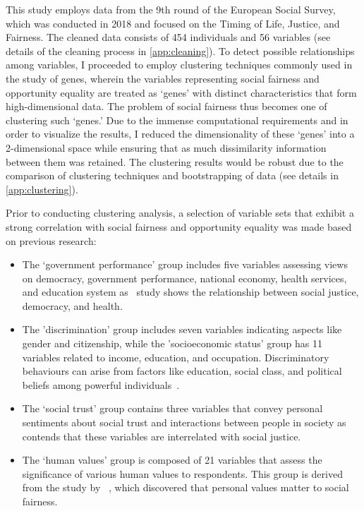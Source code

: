 This study employs data from the 9th round of the European Social Survey, which was conducted in 2018 and focused on the Timing of Life, Justice, and Fairness. The cleaned data consists of 454 individuals and 56 variables (see details of the cleaning process in \ref{app:cleaning}). To detect possible relationships among variables, I proceeded to employ clustering techniques commonly used in the study of genes, wherein the variables representing social fairness and opportunity equality are treated as ‘genes’ with distinct characteristics that form high-dimensional data. The problem of social fairness thus becomes one of clustering such ‘genes.’ Due to the immense computational requirements and in order to visualize the results, I reduced the dimensionality of these ‘genes’ into a 2-dimensional space while ensuring that as much dissimilarity information between them was retained. The clustering results would be robust due to the comparison of clustering techniques and bootstrapping of data (see details in \ref{app:clustering}).

Prior to conducting clustering analysis, a selection of variable sets that exhibit a strong correlation with social fairness and opportunity equality was made based on previous research:

\begin{itemize}

\item The ‘government performance’ group includes five variables assessing views on democracy, government performance, national economy, health services, and education system as~\citet{ruger2020social} study shows the relationship between social justice, democracy, and health.

\item The 'discrimination' group includes seven variables indicating aspects like gender and citizenship, while the 'socioeconomic status' group has 11 variables related to income, education, and occupation. Discriminatory behaviours can arise from factors like education, social class, and political beliefs among powerful individuals~\citep{bhugra2016social}.

\item The ‘social trust’ group contains three variables that convey personal sentiments about social trust and interactions between people in society as~\citet{carter2016microsociologies} contends that these variables are interrelated with social justice.

\item The ‘human values’ group is composed of 21 variables that assess the significance of various human values to respondents. This group is derived from the study by ~\citet{tittler2020personal}, which discovered that personal values matter to social fairness.

\end{itemize}

